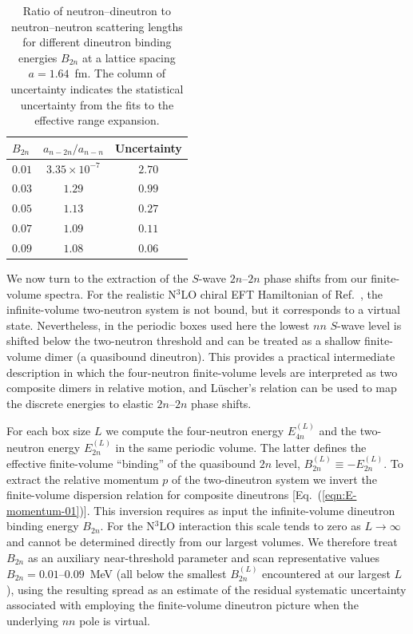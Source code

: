 \documentclass[aps,prl,showpacs,twocolumn,preprintnumbers,superscriptaddress,nofootinbib,floatfix,10pt]{revtex4-1}
\begin{document}
\begin{table}[!htp]
    \centering
    \caption{Ratio of neutron--dineutron to neutron--neutron scattering lengths for different dineutron binding energies $B_{2n}$ at a lattice spacing $a = 1.64$~fm. The column of uncertainty indicates the statistical uncertainty from the fits to the effective range expansion.}
    \begin{tabular*}{0.5\textwidth}{@{\extracolsep{\fill}}lcc@{}}
    \hline
    \hline
    $B_{2n}$ & $a_{n-2n}/a_{n-n} $ & Uncertainty \\
    \hline
    $0.01$ & $3.35\times10^{-7}$ & $2.70$ \\
    $0.03$ & $1.29$ & $0.99$ \\
    $0.05$ & $1.13$ & $0.27$ \\
    $0.07$ & $1.09$ & $0.11$ \\
    $0.09$ & $1.08$ & $0.06$ \\
    \hline
    \hline
    \end{tabular*}
    \label{tab:inbetween}
\end{table}

We now turn to the extraction of the $S$-wave $2n$--$2n$ phase shifts from our finite-volume spectra.
For the realistic N$^{3}$LO chiral EFT Hamiltonian of Ref.~\cite{Elhatisari:2022zrb}, the infinite-volume
two-neutron system is not bound, but it corresponds to a virtual state.
Nevertheless, in the periodic boxes used here the lowest $nn$ $S$-wave level is shifted below the
two-neutron threshold and can be treated as a shallow finite-volume dimer (a quasibound dineutron).
This provides a practical intermediate description in which the four-neutron finite-volume levels are interpreted
as two composite dimers in relative motion, and L\"uscher's relation can be used to map the discrete energies
to elastic $2n$--$2n$ phase shifts.


For each box size $L$ we compute the four-neutron energy $E_{4n}^{(L)}$ and the two-neutron energy $E_{2n}^{(L)}$ in the same periodic volume.
The latter defines the effective finite-volume ``binding'' of the quasibound $2n$ level,
$B_{2n}^{(L)}\equiv -E_{2n}^{(L)}$.
To extract the relative momentum $p$ of the two-dineutron system we invert the finite-volume
dispersion relation for composite dineutrons [Eq.~(\ref{eqn:E-momentum-01})].
This inversion requires as input the infinite-volume dineutron binding energy $B_{2n}$.
For the N$^{3}$LO interaction this scale tends to zero as $L\!\to\!\infty$ and cannot be determined directly
from our largest volumes.
We therefore treat $B_{2n}$ as an auxiliary near-threshold parameter and scan representative values
$B_{2n}=0.01$--$0.09$~MeV (all below the smallest $B_{2n}^{(L)}$ encountered at our largest $L$),
using the resulting spread as an estimate of the residual systematic uncertainty associated with employing
the finite-volume dineutron picture when the underlying $nn$ pole is virtual.
\end{document}
